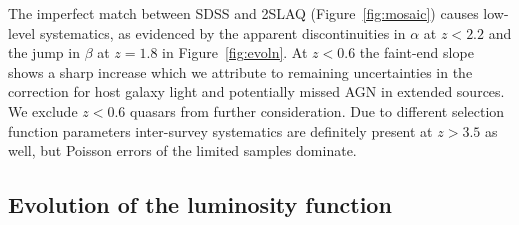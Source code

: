 \documentclass[fleqn,usenatbib]{mnras}
\begin{document}

The imperfect match between SDSS and 2SLAQ (Figure~\ref{fig:mosaic})
causes low-level systematics, as evidenced by the apparent
discontinuities in $\alpha$ at $z<2.2$ and the jump in $\beta$ at
$z=1.8$ in Figure~\ref{fig:evoln}.  At $z<0.6$ the faint-end slope
shows a sharp increase which we attribute to remaining uncertainties
in the correction for host galaxy light and potentially missed AGN in
extended sources. We exclude $z<0.6$ quasars from further
consideration. Due to different selection function parameters
inter-survey systematics are definitely present at $z>3.5$ as well,
but Poisson errors of the limited samples dominate.


\subsection{Evolution of the luminosity function}
\label{sec:global}
\end{document}
